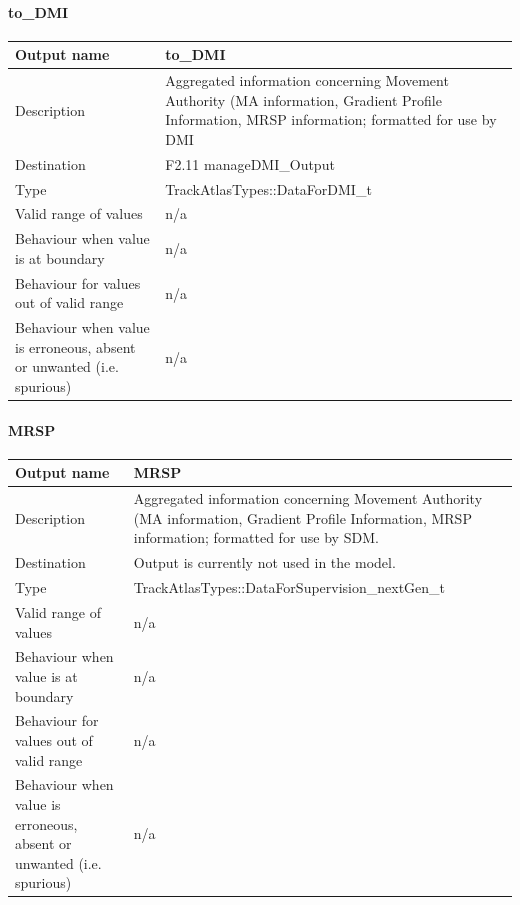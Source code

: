 \paragraph{to\_DMI}

\begin{longtable}{p{}p{}}
\toprule
Output name				& to\_DMI \\
\midrule
Description				& Aggregated information concerning Movement Authority (MA information, Gradient Profile Information, MRSP information; formatted for use by DMI \\
\midrule
Destination				& F2.11 manageDMI\_Output  \\ 
\midrule
Type					& TrackAtlasTypes::DataForDMI\_t\\
\midrule
Valid range of values	& n/a \\
\midrule
Behaviour when value is at boundary	& n/a  \\
\midrule
Behaviour for values out of valid range	& n/a  \\
\midrule
Behaviour when value is erroneous, absent or unwanted (i.e. spurious) & n/a  \\
\bottomrule
\end{longtable}

\paragraph{MRSP}

\begin{longtable}{p{}p{}}
\toprule
Output name				& MRSP \\
\midrule
Description				& Aggregated information concerning Movement Authority (MA information, Gradient Profile Information, MRSP information; formatted for use by SDM. \\
\midrule
Destination				& Output is currently not used in the model.  \\ 
\midrule
Type					& TrackAtlasTypes::DataForSupervision\_nextGen\_t\\
\midrule
Valid range of values	& n/a \\
\midrule
Behaviour when value is at boundary	& n/a  \\
\midrule
Behaviour for values out of valid range	& n/a  \\
\midrule
Behaviour when value is erroneous, absent or unwanted (i.e. spurious) & n/a  \\
\bottomrule
\end{longtable}

